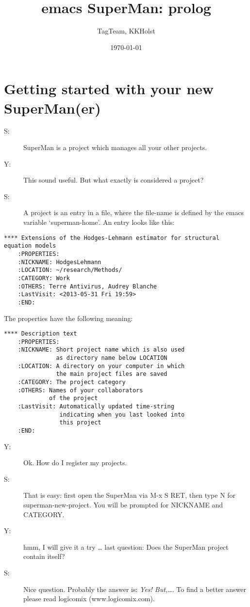 \documentclass[11pt]{article}
\author{TagTeam, KKHolst}
\date{\today}
\title{emacs SuperMan: prolog}
\begin{document}
\maketitle
\section*{Getting started with your new SuperMan(er)}
\label{sec-1}

\begin{description}
\item[{S:}] SuperMan is a project which manages all your other projects.
\item[{Y:}] This sound useful. But what exactly is considered a project?
\item[{S:}] A project is an entry in a file, where the file-name is
defined by the emacs variable `superman-home'. 
An entry looks like this:
\end{description}

\begin{verbatim}
**** Extensions of the Hodges-Lehmann estimator for structural equation models
    :PROPERTIES:
    :NICKNAME: HodgesLehmann
    :LOCATION: ~/research/Methods/
    :CATEGORY: Work
    :OTHERS: Terre Antivirus, Audrey Blanche
    :LastVisit: <2013-05-31 Fri 19:59>
    :END:
\end{verbatim}

The properties have the following meaning:

\begin{verbatim}
**** Description text
    :PROPERTIES:
    :NICKNAME: Short project name which is also used
               as directory name below LOCATION 
    :LOCATION: A directory on your computer in which
               the main project files are saved
    :CATEGORY: The project category
    :OTHERS: Names of your collaborators
             of the project
    :LastVisit: Automatically updated time-string
                indicating when you last looked into
                this project
    :END:
\end{verbatim}

\begin{description}
\item[{Y:}] Ok. How do I register my projects.
\item[{S:}] That is easy: first open the SuperMan via M-x S RET,
then type N for superman-new-project. You will be
prompted for NICKNAME and CATEGORY.
\item[{Y:}] hmm, I will give it a try \ldots{} last question: Does the SuperMan project contain itself?
\item[{S:}] Nice question. Probably the answer is: \emph{Yes! But,\ldots{}}. To find a better answer please read logicomix (www.logicomix.com).
\end{description}
\end{document}
